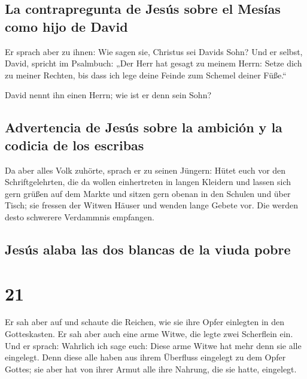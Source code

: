 \hypertarget{la-contrapregunta-de-jesuxfas-sobre-el-mesuxedas-como-hijo-de-david}{%
\subsection{La contrapregunta de Jesús sobre el Mesías como hijo de
David}\label{la-contrapregunta-de-jesuxfas-sobre-el-mesuxedas-como-hijo-de-david}}

 Er sprach aber zu ihnen: Wie sagen sie, Christus sei
Davids Sohn?  Und er selbst, David, spricht im Psalmbuch:
„Der Herr hat gesagt zu meinem Herrn: Setze dich zu meiner Rechten,
 bis dass ich lege deine Feinde zum Schemel deiner
Füße.``

 David nennt ihn einen Herrn; wie ist er denn sein Sohn?

\hypertarget{advertencia-de-jesuxfas-sobre-la-ambiciuxf3n-y-la-codicia-de-los-escribas}{%
\subsection{Advertencia de Jesús sobre la ambición y la codicia de los
escribas}\label{advertencia-de-jesuxfas-sobre-la-ambiciuxf3n-y-la-codicia-de-los-escribas}}

 Da aber alles Volk zuhörte, sprach er zu seinen Jüngern:
 Hütet euch vor den Schriftgelehrten, die da wollen
einhertreten in langen Kleidern und lassen sich gern grüßen auf dem
Markte und sitzen gern obenan in den Schulen und über Tisch;
 sie fressen der Witwen Häuser und wenden lange Gebete
vor. Die werden desto schwerere Verdammnis empfangen.

\hypertarget{jesuxfas-alaba-las-dos-blancas-de-la-viuda-pobre}{%
\subsection{Jesús alaba las dos blancas de la viuda
pobre}\label{jesuxfas-alaba-las-dos-blancas-de-la-viuda-pobre}}

\hypertarget{section-20}{%
\section{21}\label{section-20}}

 Er sah aber auf und schaute die Reichen, wie sie ihre
Opfer einlegten in den Gotteskasten.  Er sah aber auch
eine arme Witwe, die legte zwei Scherflein ein.  Und er
sprach: Wahrlich ich sage euch: Diese arme Witwe hat mehr denn sie alle
eingelegt.  Denn diese alle haben aus ihrem Überfluss
eingelegt zu dem Opfer Gottes; sie aber hat von ihrer Armut alle ihre
Nahrung, die sie hatte, eingelegt.

